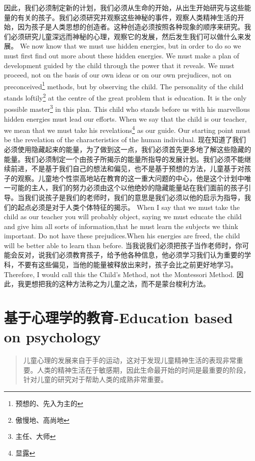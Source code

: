 \documentclass[lang=cn,10pt]{elegantbook}
\begin{document}
因此，我们必须制定新的计划，我们必须从生命的开始，从出生开始研究与这些能量的有关的孩子。我们必须研究并观察这些神秘的事件，观察人类精神生活的开始，因为孩子是人类思想的创造者。这种创造必须按照各种现象的顺序来研究。我们必须研究儿童深远而神秘的心理，观察它的发展，然后发生我们可以做什么来发展。
We now know that we must use hidden energies, but in order to do so we must first find out more about these hidden energies. We must make a plan of development guided by the child through the power that it reveals. We must proceed, not on the basis of our own ideas or on our own prejudices, not on preconceived\footnote{预想的、先入为主的} methods, but by observing the child. The personality of the child stands loftily\footnote{傲慢地、高尚地} at the centre of the great problem that is education. It is the only possible master\footnote{主任、大师} in this plan. This child who stands before us with his marvellous hidden energies must lead our efforts. When we say that the child is our teacher, we mean that we must take his revelations\footnote{显露} as our guide. Our starting point must be the revelation of the characteristics of the human individual.
现在知道了我们必须使用隐藏起来的能量，为了做到这一点，我们必须首先更多地了解这些隐藏的能量。我们必须制定一个由孩子所揭示的能量所指导的发展计划。我们必须不能继续前进，不是基于我们自己的想法和偏见，也不是基于预想的方法，儿童基于对孩子的观察。儿童地个性崇高地站在教育的这一重大问题的中心，他是这个计划中唯一可能的主人，我们的努力必须由这个以他绝妙的隐藏能量站在我们面前的孩子引导。当我们说孩子是我们的老师时，我们的意思是我们必须以他的启示为指导，我们的起点必须是对于人类个体特征的揭示。
When I say that we must take the child as our teacher you will probably object, saying we must educate the child and give him all sorts of information,that he must learn the subjects we think important. Do not have these prejudices.When his energies are freed, the child will be better able to learn than before.
当我说我们必须把孩子当作老师时，你可能会反对，说我们必须教育孩子，给予他各种信息，他必须学习我们认为重要的学科，不要有这些偏见，当他的能量被释放出来时，孩子会比之前更好地学习。
Therefore, I would call this the Child's Method, not the Montessori Method.
因此，我更想把我的这种方法称之为儿童之法，而不是蒙台梭利方法。

\chapter{基于心理学的教育-Education based on psychology}

\begin{quote}
{\small 儿童心理的发展来自于手的运动，这对于发现儿童精神生活的表现非常重要。人类的精神生活在于敏感期，因此生命最开始的时间是最重要的阶段，针对儿童的研究对于帮助人类的成熟非常重要。}
\end{quote}
\end{document}
